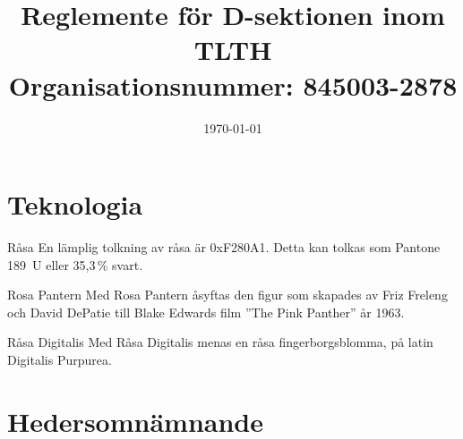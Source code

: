 \documentclass[pdfbookmarks,a4paper,11pt]{article}
\title{Reglemente för D-sektionen inom TLTH\\ Organisationsnummer: 845003-2878}
\date{\today}
\newlength{\itemcollength}
\newenvironment{reglemlista}{%
  \begin{list}{}{%
      \setlength{\labelwidth}{\itemcollength}%
      \setlength{\leftmargin}{\labelwidth + \labelsep}%
      \renewcommand{\makelabel}[1]{%
        \raisebox{0pt}[1ex][0pt]{%
          \makebox[\labelwidth][l]{%
            \parbox[t]{\itemcollength}{%
              \raggedright\hspace{0pt}##1}}}\hfill}%
      }}{%
  \end{list}}
\begin{document}
\maketitle

\section{Teknologia}

\begin{reglemlista}

	\item[Råsa]
	En lämplig tolkning av råsa är 0xF280A1. Detta kan tolkas som Pantone
	189~U eller 35,3\,\% svart.

	\item[Rosa Pantern]
	Med Rosa Pantern åsyftas den figur som skapades av Friz Freleng och David
	DePatie till Blake Edwards film ''The Pink Panther'' år 1963.

	\item[Råsa Digitalis]
	Med Råsa Digitalis menas en råsa fingerborgsblomma, på latin Digitalis Purpurea.

\end{reglemlista}


\section{Hedersomnämnande}
\end{document}
